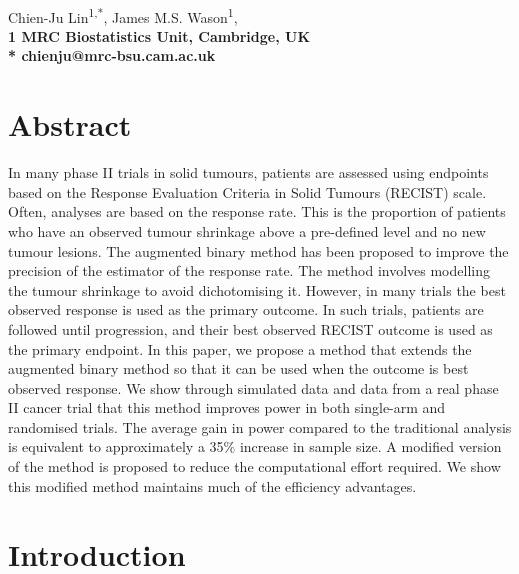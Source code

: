 \documentclass[10pt,A4]{article}
\begin{document}
\vspace*{0.35in}

\begin{flushleft}
{\Large
\textbf{}
}
\newline
\\
Chien-Ju Lin\textsuperscript{1,*},
James M.S. Wason\textsuperscript{1},
\\
\bigskip
\bf{1} MRC Biostatistics Unit, Cambridge, UK
\\
\bigskip
* chienju@mrc-bsu.cam.ac.uk

\end{flushleft}

\section*{Abstract}
In many phase II trials in solid tumours, patients are assessed using endpoints based on the Response Evaluation Criteria in Solid Tumours (RECIST) scale. Often, analyses are based on the response rate. This is the proportion of patients who have an observed tumour shrinkage above a pre-defined level and no new tumour lesions. The augmented binary method has been proposed to improve the precision of the estimator of the response rate. The method involves modelling the tumour shrinkage to avoid dichotomising it. However, in many trials the best observed response is used as the primary outcome. In such trials, patients are followed until progression, and their best observed RECIST outcome is used as the primary endpoint. In this paper, we propose a method that extends the augmented binary method so that it can be used when the outcome is best observed response. We show through simulated data and data from a real phase II cancer trial that this method improves power in both single-arm and randomised trials. The average gain in power compared to the traditional analysis is equivalent to approximately a 35$\%$ increase in sample size. A modified version of the method is proposed to reduce the computational effort required. We show this modified method maintains much of the efficiency advantages.



\section{Introduction}
\label{sec1}
\end{document}
